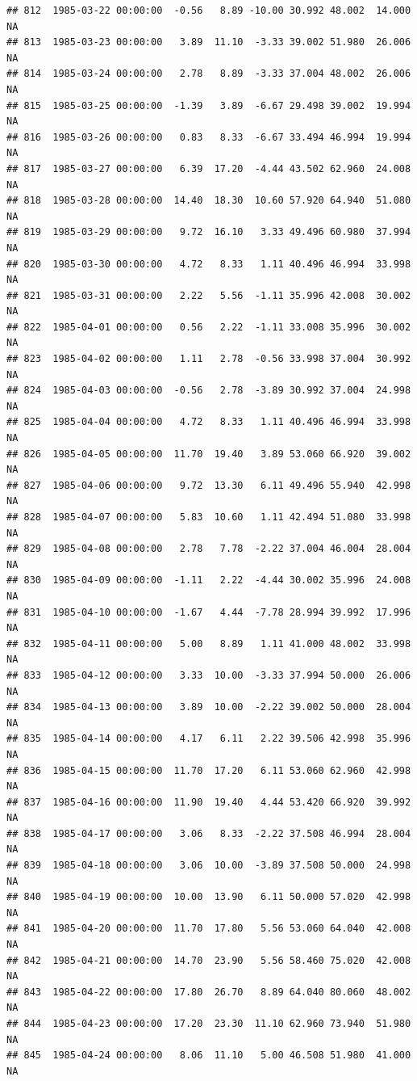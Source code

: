 \documentclass{article}\usepackage{graphicx, color}
\makeatletter
\newenvironment{kframe}{%
 \def\at@end@of@kframe{}%
 \ifinner\ifhmode%
  \def\at@end@of@kframe{\end{minipage}}%
  \begin{minipage}{\columnwidth}%
 \fi\fi%
 \def\FrameCommand##1{\hskip\@totalleftmargin \hskip-\fboxsep
 \colorbox{shadecolor}{##1}\hskip-\fboxsep
     \hskip-\linewidth \hskip-\@totalleftmargin \hskip\columnwidth}%
 \MakeFramed {\advance\hsize-\width
   \@totalleftmargin\z@ \linewidth\hsize
   \@setminipage}}%
 {\par\unskip\endMakeFramed%
 \at@end@of@kframe}
\newenvironment{knitrout}{}{} %
\makeatother
\begin{document}
\begin{knitrout}
\begin{kframe}
\begin{verbatim}
## 812  1985-03-22 00:00:00  -0.56   8.89 -10.00 30.992 48.002  14.000     NA
## 813  1985-03-23 00:00:00   3.89  11.10  -3.33 39.002 51.980  26.006     NA
## 814  1985-03-24 00:00:00   2.78   8.89  -3.33 37.004 48.002  26.006     NA
## 815  1985-03-25 00:00:00  -1.39   3.89  -6.67 29.498 39.002  19.994     NA
## 816  1985-03-26 00:00:00   0.83   8.33  -6.67 33.494 46.994  19.994     NA
## 817  1985-03-27 00:00:00   6.39  17.20  -4.44 43.502 62.960  24.008     NA
## 818  1985-03-28 00:00:00  14.40  18.30  10.60 57.920 64.940  51.080     NA
## 819  1985-03-29 00:00:00   9.72  16.10   3.33 49.496 60.980  37.994     NA
## 820  1985-03-30 00:00:00   4.72   8.33   1.11 40.496 46.994  33.998     NA
## 821  1985-03-31 00:00:00   2.22   5.56  -1.11 35.996 42.008  30.002     NA
## 822  1985-04-01 00:00:00   0.56   2.22  -1.11 33.008 35.996  30.002     NA
## 823  1985-04-02 00:00:00   1.11   2.78  -0.56 33.998 37.004  30.992     NA
## 824  1985-04-03 00:00:00  -0.56   2.78  -3.89 30.992 37.004  24.998     NA
## 825  1985-04-04 00:00:00   4.72   8.33   1.11 40.496 46.994  33.998     NA
## 826  1985-04-05 00:00:00  11.70  19.40   3.89 53.060 66.920  39.002     NA
## 827  1985-04-06 00:00:00   9.72  13.30   6.11 49.496 55.940  42.998     NA
## 828  1985-04-07 00:00:00   5.83  10.60   1.11 42.494 51.080  33.998     NA
## 829  1985-04-08 00:00:00   2.78   7.78  -2.22 37.004 46.004  28.004     NA
## 830  1985-04-09 00:00:00  -1.11   2.22  -4.44 30.002 35.996  24.008     NA
## 831  1985-04-10 00:00:00  -1.67   4.44  -7.78 28.994 39.992  17.996     NA
## 832  1985-04-11 00:00:00   5.00   8.89   1.11 41.000 48.002  33.998     NA
## 833  1985-04-12 00:00:00   3.33  10.00  -3.33 37.994 50.000  26.006     NA
## 834  1985-04-13 00:00:00   3.89  10.00  -2.22 39.002 50.000  28.004     NA
## 835  1985-04-14 00:00:00   4.17   6.11   2.22 39.506 42.998  35.996     NA
## 836  1985-04-15 00:00:00  11.70  17.20   6.11 53.060 62.960  42.998     NA
## 837  1985-04-16 00:00:00  11.90  19.40   4.44 53.420 66.920  39.992     NA
## 838  1985-04-17 00:00:00   3.06   8.33  -2.22 37.508 46.994  28.004     NA
## 839  1985-04-18 00:00:00   3.06  10.00  -3.89 37.508 50.000  24.998     NA
## 840  1985-04-19 00:00:00  10.00  13.90   6.11 50.000 57.020  42.998     NA
## 841  1985-04-20 00:00:00  11.70  17.80   5.56 53.060 64.040  42.008     NA
## 842  1985-04-21 00:00:00  14.70  23.90   5.56 58.460 75.020  42.008     NA
## 843  1985-04-22 00:00:00  17.80  26.70   8.89 64.040 80.060  48.002     NA
## 844  1985-04-23 00:00:00  17.20  23.30  11.10 62.960 73.940  51.980     NA
## 845  1985-04-24 00:00:00   8.06  11.10   5.00 46.508 51.980  41.000     NA

\end{verbatim}
\end{kframe}
\end{knitrout}
\end{document}
